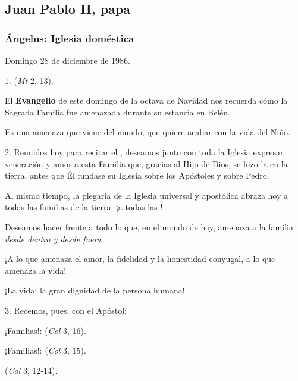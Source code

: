 \begin{body}
\begin{body}
\subsection{Juan Pablo II, papa}

\subsubsection{Ángelus: Iglesia doméstica}

Domingo 28 de diciembre de 1986.

1.  (\emph{Mt} 2, 13).

El \textbf{Evangelio} de este domingo de la octava de Navidad nos recuerda cómo la Sagrada Familia fue amenazada durante su estancia en Belén.

Es una amenaza que viene del mundo, que quiere acabar con la vida del Niño.

2. Reunidos hoy para recitar el , deseamos junto con toda la Iglesia expresar veneración y amor a esta Familia que, gracias al Hijo de Dios, se hizo la  en la tierra, antes que Él fundase su Iglesia sobre los Apóstoles y sobre Pedro.

Al mismo tiempo, la plegaria de la Iglesia universal y apostólica abraza hoy a todas las familias de la tierra: ¡a todas las !

Deseamos hacer frente a todo lo que, en el mundo de hoy, amenaza a la familia \emph{desde dentro y desde fuera}:

¡A lo que amenaza el amor, la fidelidad y la honestidad conyugal, a lo que amenaza la vida!

¡La vida: la gran dignidad de la persona humana!

3. Recemos, pues, con el Apóstol:

¡Familias!:  (\emph{Col} 3, 16).

¡Familias!:  (\emph{Col} 3, 15).

 (\emph{Col} 3, 12-14).


\end{body}
\end{body}
